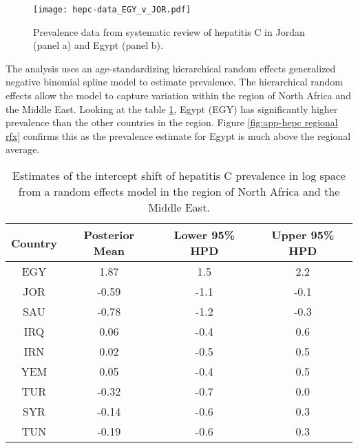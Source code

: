     \begin{figure}[h]
        \begin{center}
            \texttt{[image: hepc-data\_EGY\_v\_JOR.pdf]}
            \caption{Prevalence data from systematic review of hepatitis C in Jordan (panel a) and Egypt (panel b).}
            \label{fig:app-hepc data}
        \end{center}
    \end{figure}

The analysis uses an age-standardizing hierarchical random effects generalized negative binomial spline model to estimate prevalence.  The hierarchical random effects allow the model to capture variation within the region of North Africa and the Middle East.  Looking at the table \ref{tab:app-hepc regional rfx}, Egypt (EGY) has significantly higher prevalence than the other countries in the region.  Figure \ref{fig:app-hepc regional rfx} confirms this as the prevalence estimate for Egypt is much above the regional average.

    \begin{table}[h]
        \begin{center}
        \caption{ Estimates of the intercept shift of hepatitis C prevalence in log space from a random effects model in the region of North Africa and the Middle East.}
        \label{tab:app-hepc regional rfx}
        \begin{tabular}{|c|c|c|c|}
            \hline
                Country & Posterior Mean & Lower 95\% HPD  & Upper 95\%  HPD \\
            \hline
                EGY	&	1.87	&	 1.5	&	2.2	\\
                JOR	&	-0.59	&	-1.1	&	-0.1 \\
                SAU	&	-0.78	&	-1.2	&	-0.3 \\
                IRQ	&	0.06	&	-0.4	&	0.6	\\
                IRN	&	0.02	&	-0.5	&	0.5	\\
                YEM	&	0.05	&	-0.4	&	0.5	\\
                TUR	&	-0.32	&	-0.7	&	0.0	\\
                SYR	&	-0.14	&	-0.6	&	0.3	\\
                TUN	&	-0.19	&	-0.6	&	0.3	\\
            \hline
        \end{tabular}
        \end{center}
    \end{table}

